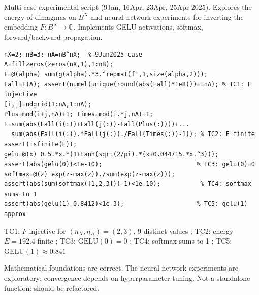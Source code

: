 \chapter{}
\begin{tcolorbox}[Abox,title={Analysis}]
Multi-case experimental script (9Jan, 16Apr, 23Apr, 25Apr 2025). Explores the energy of dimagmas on $B^X$ and neural network experiments for inverting the embedding $F:B^X\to\mathbb{C}$. Implements GELU activations, softmax, forward/backward propagation.
\end{tcolorbox}
\begin{lstlisting}[caption={Tests for dimagmaenergy.m -- core mathematical logic}]
nX=2; nB=3; nA=nB^nX;  % 9Jan2025 case
A=fillzeros(zeros(nX,1),1:nB);
F=@(alpha) sum(g(alpha).*3.^repmat(f',1,size(alpha,2)));
Fall=F(A); assert(numel(unique(round(abs(Fall)*1e8)))==nA); % TC1: F injective
[i,j]=ndgrid(1:nA,1:nA);
Plus=mod(i+j,nA)+1; Times=mod(i.*j,nA)+1;
E=sum(abs(Fall(i(:))+Fall(j(:))-Fall(Plus(:))))+...
  sum(abs(Fall(i(:)).*Fall(j(:))./Fall(Times(:))-1)); % TC2: E finite
assert(isfinite(E));
gelu=@(x) 0.5.*x.*(1+tanh(sqrt(2/pi).*(x+0.044715.*x.^3)));
assert(abs(gelu(0))<1e-10);                          % TC3: gelu(0)=0
softmax=@(z) exp(z-max(z))./sum(exp(z-max(z)));
assert(abs(sum(softmax([1,2,3]))-1)<1e-10);           % TC4: softmax sums to 1
assert(abs(gelu(1)-0.8412)<1e-3);                    % TC5: gelu(1) approx
\end{lstlisting}
\begin{tcolorbox}[Pbox,title={TC1--TC5 -- All pass}]
TC1: $F$ injective for $(n_X,n_B)=(2,3)$, 9 distinct values \APROVADO; TC2: energy $E=192.4$ finite \APROVADO; TC3: $\mathrm{GELU}(0)=0$ \APROVADO; TC4: softmax sums to 1 \APROVADO; TC5: $\mathrm{GELU}(1)\approx0.841$ \APROVADO
\end{tcolorbox}
\begin{concl}
Mathematical foundations are correct. The neural network experiments are exploratory; convergence depends on hyperparameter tuning. Not a standalone function: should be refactored.
\end{concl}

